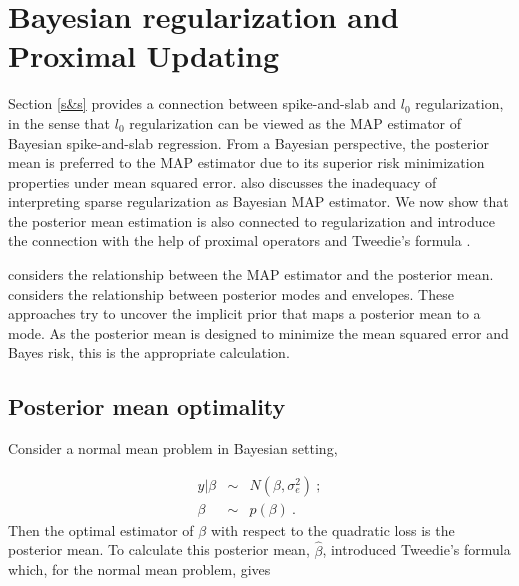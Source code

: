 \documentclass[11pt]{article}%
\numberwithin{equation}{section}
\theoremstyle{plain}
\begin{document}
\section{Bayesian regularization and Proximal Updating \label{phi}}

Section \ref{s&s} provides a connection between spike-and-slab and $l_0$ regularization, in the sense that $l_0$ regularization can be viewed as the MAP estimator of Bayesian spike-and-slab regression.  From a Bayesian perspective, the posterior mean is preferred to the MAP estimator due to its superior risk minimization properties under mean squared error.  \cite{starck2013} also discusses the inadequacy of interpreting sparse regularization as Bayesian MAP estimator.  We now show that the posterior mean estimation is also connected to regularization and introduce the connection with the help of proximal operators and Tweedie's formula \citep{efron2011}.

\cite{gribonval2011} considers the relationship between the MAP estimator and the posterior mean. \cite{polson2016} considers the relationship between posterior modes and envelopes. These approaches try to uncover the implicit prior that maps a posterior mean to a mode. As the posterior mean is designed to minimize the mean squared error and Bayes risk, this is the appropriate calculation.

\subsection{Posterior mean optimality}

Consider a normal mean problem in Bayesian setting,

\begin{equation}
\label{normmean}
\begin{array}{rcl}
y | \beta & \sim & N(\beta, \sigma_e^2) \ ;\\
\beta & \sim & p\left(\beta\right) \ .
\end{array}
\end{equation}
Then the optimal estimator of $\beta$ with respect to the quadratic loss is the posterior mean.  To calculate this posterior mean, $\hat\beta$, \cite{efron2011} introduced Tweedie's formula which, for the normal mean problem, gives
\end{document}
